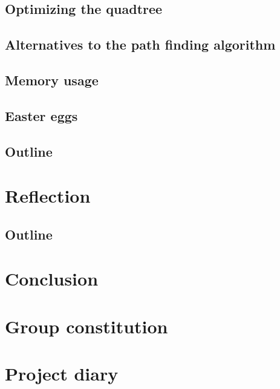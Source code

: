 \documentclass[a4paper,11pt]{article}
\begin{document}
\subsection{Optimizing the quadtree}


\subsection{Alternatives to the path finding algorithm}


\subsection{Memory usage}


\subsection{Easter eggs}


\subsection{Outline}



\pagebreak
\section{Reflection}

\subsection{Outline}



\pagebreak
\section{Conclusion}
\label{sec:Conclusion}



\pagebreak
\appendix
\section{Group constitution}



\pagebreak
\section{Project diary}
\end{document}
